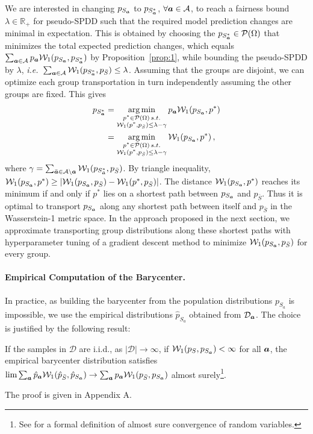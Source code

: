 \documentclass[letterpaper]{article}
\newcommand{\ie}{\emph{i.e.}}
\theoremstyle{definition}
\newcommand{\W}{\mathcal{W}}
\newcommand{\Sa}{S_{\va}}
\newcommand{\bS}{\bar{S}}
\begin{document}
We are interested in changing $p_{\Sa}$ to $p_{\Sa^*}$, $\forall {\bm{a}} \in\mathcal{A}$, to reach a fairness bound $\lambda\in \mathbb{R}_+$ for pseudo-SPDD such that the required model prediction changes are minimal in expectation. This is obtained by choosing the $p_{\Sa^*} \in\mathcal{P}(\Omega)$ that minimizes the total expected prediction changes, which equals $\sum_{\va\in\mathcal{A}}p_{\va}\W_1(p_{\Sa}, p_{\Sa^*})$ by Proposition~\ref{prop:1}, while bounding the pseudo-SPDD by $\lambda$, \ie~$\sum_{\va\in \mathcal{A}} \W_1(p_{\Sa^*}, p_{\bS}) \leq \lambda$. Assuming that the groups are disjoint, we can optimize each group transportation in turn independently assuming the other groups are fixed. This gives 
\begin{align*}
    p_{\Sa^*} &= \argmin_{\substack{p^*\in\mathcal{P}(\Omega) \, s.t.\\ \W_1(p^*, p_{\bar{S}}) \leq \lambda - \gamma}} p_{\va}\W_1(p_{\Sa}, p^*) \\
    &= \argmin_{\substack{p^*\in\mathcal{P}(\Omega) \, s.t.\\ \W_1(p^*, p_{\bS}) \leq \lambda - \gamma}} \W_1(p_{\Sa}, p^*)\,,
\end{align*}
where $\gamma = \sum_{\bar \va\in \mathcal{A}\setminus \va} \W_1(p_{S_{\bar{\va}}^*}, p_{\bS})$. 
By triangle inequality, $\W_1(p_{\Sa}, p^*) \geq |\W_1(p_{\Sa}, p_{\bS})-\W_1(p^*, p_{\bS})|$. 
The distance $\W_1(p_{\Sa}, p^*)$ reaches its minimum if and only if $p^*$ lies on a shortest path between $p_{\Sa}$ and $p_{\bS}$. Thus it is optimal to transport $p_{\Sa}$ along any shortest path between itself and $p_{\bS}$ in the Wasserstein-1 metric space. 
In the approach proposed in the next section, we approximate transporting group distributions along these shortest paths with hyperparameter tuning of a gradient descent method to minimize $\W_1(p_{\Sa}, p_{\bS})$ for every group.

\paragraph{Empirical Computation of the Barycenter.}
In practice, as building the barycenter from the population distributions $p_{S_a}$ is impossible, we use the empirical distributions $\hat{p}_{S_a}$ obtained from $\mathcal{D}_{{\bm{a}}}$. The choice is justified by the following result:
\begin{lemma}
If the samples in $\mathcal{D}$ are i.i.d., as $| \mathcal{D} | \rightarrow \infty$,  if $\W_1(p_{S}, p_{S_{\va}})< \infty $ for all ${\bm{a}}$, the empirical barycenter distribution satisfies  $\lim \sum_{\va} \hat{p}_{\va} \W_1(\hat{p}_{\bS}, \hat{p}_{S_\va}) \rightarrow \sum_{\va} p_{\va} \W_1(p_{\bS}, p_{S_\va})$ almost surely\footnote{See \cite{klenke13probability} for a formal definition of almost sure convergence of random variables.}. 
\end{lemma}
The proof is given in Appendix A.
\end{document}
